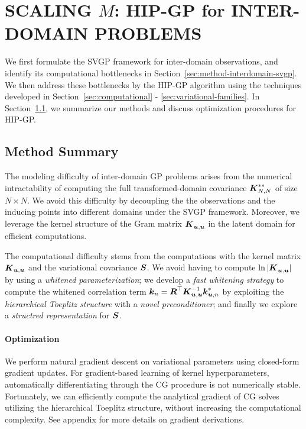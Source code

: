 \section{SCALING $M$: HIP-GP for INTER-DOMAIN PROBLEMS}
\label{sec:hip-gps}
We first formulate the SVGP framework for inter-domain observations, and identify
its computational bottlenecks in Section~\ref{sec:method-interdomain-svgp}.
We then address these bottlenecks by the HIP-GP algorithm using the techniques developed in
Section~\ref{sec:computational} - \ref{sec:variational-families}.
In Section~\ref{sec:method-summary}, we summarize our methods and discuss
optimization procedures for HIP-GP.


%


\subsection{Method Summary}
\label{sec:method-summary}
The modeling difficulty of inter-domain GP problems arises from the numerical intractability
of computing the full transformed-domain covariance
$\boldsymbol{K}^{**}_{N,N}$ of size $N \times N$. We avoid this difficulty by decoupling the
 the observations and the inducing points into different domains under the SVGP framework.
Moreover, we leverage the kernel structure of the Gram matrix
$\boldsymbol{K}^{}_{\boldsymbol{u},\boldsymbol{u}}$ in the latent domain for efficient computations.

The computational
difficulty stems from the computations with the kernel matrix $\boldsymbol{K}_{\boldsymbol{u},\boldsymbol{u}}$ and the variational covariance $\boldsymbol{S}$.  We avoid having to
compute $\ln|\boldsymbol{K}^{}_{\boldsymbol{u},\boldsymbol{u}}|$ by using a \emph{whitened parameterization};
we develop a \emph{fast whitening strategy} to compute the whitened correlation term
 $\boldsymbol{k}_n = \boldsymbol{R}^\top \boldsymbol{K}_{\boldsymbol{u}, \boldsymbol{u}}^{-1} \boldsymbol{k}^{*}_{\boldsymbol{u},n}$
by exploiting  the \emph{hierarchical Toeplitz structure} with a \emph{novel
preconditioner};
and finally we explore a \emph{structred representation} for $\boldsymbol{S}$.

\paragraph{Optimization} We perform natural gradient descent on
variational parameters using closed-form gradient updates.
For gradient-based learning of kernel hyperparameters, automatically differentiating
through the CG procedure is not numerically stable.
Fortunately, we can efficiently compute the analytical gradient of CG solves 
utilizing the hierarchical Toeplitz structure,
without increasing the computational complexity.
See appendix for more details on gradient derivations.
